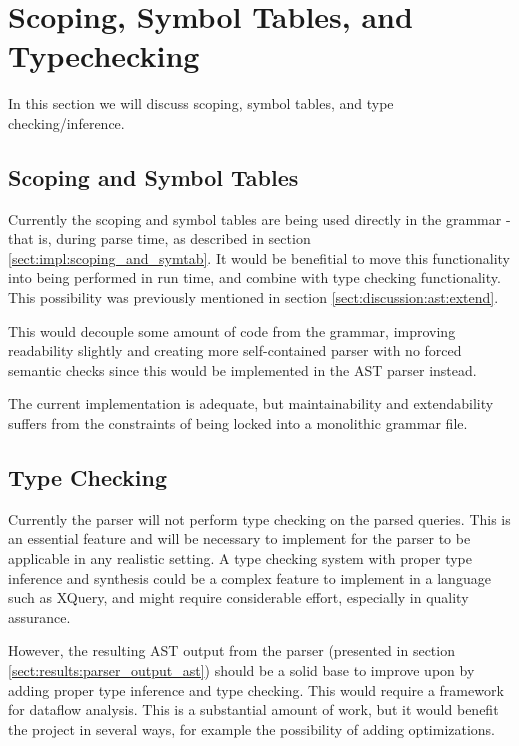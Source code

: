 \section{Scoping, Symbol Tables, and Typechecking}
In this section we will discuss scoping, symbol tables, and type
checking/inference.

\subsection{Scoping and Symbol Tables}
\label{sect:discussion:scoping_and_symtab}
Currently the scoping and symbol tables are being used directly in the grammar -
that is, during parse time, as described in section
\ref{sect:impl:scoping_and_symtab}. It would be benefitial to move this
functionality into being performed in run time, and combine with type checking
functionality. This possibility was previously mentioned in section
\ref{sect:discussion:ast:extend}.

This would decouple some amount of code from the grammar, improving readability
slightly and creating more self-contained parser with no forced semantic checks
since this would be implemented in the AST parser instead.

The current implementation is adequate, but maintainability and extendability
suffers from the constraints of being locked into a monolithic grammar file.

\subsection{Type Checking}
Currently the parser will not perform type checking on the parsed queries. This
is an essential feature and will be necessary to implement for the parser to be
applicable in any realistic setting. A type checking system with proper type
inference and synthesis could be a complex feature to implement in a language
such as XQuery, and might require considerable effort, especially in quality
assurance. 

However, the resulting AST output from the parser (presented in section
\ref{sect:results:parser_output_ast}) should be a solid base to improve upon by
adding proper type inference and type checking. This would require a framework
for dataflow analysis. This is a substantial amount of work, but it would
benefit the project in several ways, for example the possibility of adding
optimizations.